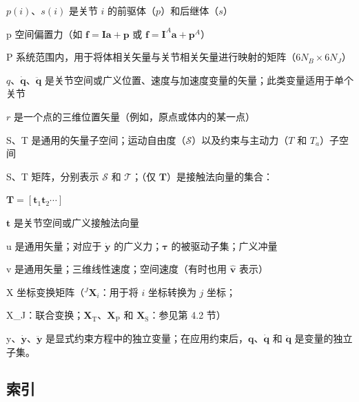 \documentclass[10pt,a4paper]{book}
\theoremstyle{thmstyle} %
\theoremstyle{defstyle} %
\theoremstyle{prostyle} %
\begin{document}
$p(i)$、$s(i)$ 是关节 $i$ 的前驱体（$p$）和后继体（$s$）



p 空间偏置力（如 $\boldsymbol{f}=\boldsymbol{I}\boldsymbol{a}+\boldsymbol{p}$ 或 $\boldsymbol{f}=\boldsymbol{I}^{A}\boldsymbol{a}+\boldsymbol{p}^{A}$）



P 系统范围内，用于将体相关矢量与关节相关矢量进行映射的矩阵（$6N_{B}\times6N_{J}$）



$q$、$\dot{\boldsymbol{q}}$、$\ddot{\boldsymbol{q}}$ 是关节空间或广义位置、速度与加速度变量的矢量；此类变量适用于单个关节



$r$ 是一个点的三维位置矢量（例如，原点或体内的某一点）



S、T 是通用的矢量子空间；运动自由度（$\mathcal{S}$）以及约束与主动力（$T$ 和 $T_{a}$）子空间



S、T 矩阵，分别表示 $\mathcal{S}$ 和 $\mathcal{T}$；（仅 $\boldsymbol{T}$）是接触法向量的集合：



$\boldsymbol{T}=[\boldsymbol{t}_{1}\boldsymbol{t}_{2}\cdots]$



$\boldsymbol{t}$ 是关节空间或广义接触法向量



u 是通用矢量；对应于 $\dot{\boldsymbol{y}}$ 的广义力；$\boldsymbol{\tau}$ 的被驱动子集；广义冲量



v 是通用矢量；三维线性速度；空间速度（有时也用 $\hat{\boldsymbol{v}}$ 表示）



X 坐标变换矩阵（$^{J}\boldsymbol{X}_{i}$：用于将 $i$ 坐标转换为 $j$ 坐标；



X\_{J}：联合变换；$\boldsymbol{X}_{\mathrm{T}}$、$\boldsymbol{X}_{\mathrm{P}}$ 和 $\boldsymbol{X}_{\mathrm{S}}$：参见第 4.2 节）



y、$\dot{\boldsymbol{y}}$、$\ddot{\boldsymbol{y}}$ 是显式约束方程中的独立变量；在应用约束后，$\boldsymbol{q}$、$\dot{\boldsymbol{q}}$ 和 $\ddot{\boldsymbol{q}}$ 是变量的独立子集。



\subsection{索引}
\end{document}
